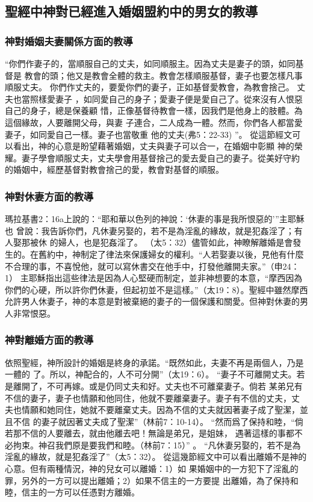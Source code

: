 \subsection{聖經中神對已經進入婚姻盟約中的男女的教導}
\subsubsection{神對婚姻夫妻關係方面的教導}
“你們作妻子的，當順服自己的丈夫，如同順服主。因為丈夫是妻子的頭，如同基督是
教會的頭；他又是教會全體的救主。教會怎樣順服基督，妻子也要怎樣凡事順服丈夫。
你們作丈夫的，要愛你們的妻子，正如基督愛教會，為教會捨己。 丈夫也當照樣愛妻子
，如同愛自己的身子；愛妻子便是愛自己了。從來沒有人恨惡自己的身子，總是保養顧
惜，正像基督待教會一樣，因我們是他身上的肢體。為這個緣故，人要離開父母，與妻
子連合，二人成為一體。然而，你們各人都當愛妻子，如同愛自己一樣。妻子也當敬重
他的丈夫(弗5：22-33) ”。
從這節經文可以看出，神的心意是盼望藉著婚姻，丈夫與妻子可以合一，在婚姻中彰顯
神的榮耀。妻子學會順服丈夫，丈夫學會用基督捨己的愛去愛自己的妻子。從美好守約
的婚姻中，經歷基督對教會捨己的愛，教會對基督的順服。


\subsubsection{神對休妻方面的教導}
瑪拉基書2：16a上說的：“耶和華以色列的神說：‘休妻的事是我所恨惡的’”主耶穌也
曾說：我告訴你們，凡休妻另娶的，若不是為淫亂的緣故，就是犯姦淫了；有人娶那被休
的婦人，也是犯姦淫了。 （太5：32）儘管如此，神瞭解離婚是會發生的。在舊約中，神制定了律法來保護婦女的權利。“人若娶妻以後，見他有什麼不合理的事，不喜悅他，就可以寫休書交在他手中，打發他離開夫家。”（申24：1） 主耶穌指出這些律法是因為人心堅硬而制定，並非神想要的本意，“摩西因為你們的心硬，所以許你們休妻，但起初並不是這樣。”（太19：8）。聖經中雖然摩西允許男人休妻子，神的本意是對被棄絕的妻子的一個保護和關愛。但神對休妻的男人非常恨惡。

\subsubsection{神對離婚方面的教導}
依照聖經，神所設計的婚姻是終身的承諾。“既然如此，夫妻不再是兩個人，乃是一體的
了。所以，神配合的，人不可分開”（太19：6）。
“妻子不可離開丈夫。若是離開了，不可再嫁。或是仍同丈夫和好。丈夫也不可離棄妻子。倘若
某弟兄有不信的妻子，妻子也情願和他同住，他就不要離棄妻子。妻子有不信的丈夫，丈
夫也情願和她同住，她就不要離棄丈夫。因為不信的丈夫就因著妻子成了聖潔，並且不信
的妻子就因著丈夫成了聖潔”（林前7：10-14）。
“然而爲了保持和睦，“倘若那不信的人要離去，就由他離去吧！無論是弟兄，是姐妹，
遇著這樣的事都不必拘束。神召我們原是要我們和睦。（林前7：15）” 。
“凡休妻另娶的，若不是為淫亂的緣故，就是犯姦淫了”（太5：32）。
從這幾節經文中可以看出離婚不是神的心意。但有兩種情況，神的兒女可以離婚：1）如
果婚姻中的一方犯下了淫亂的罪，另外的一方可以提出離婚；2）如果不信主的一方要提
出離婚，為了保持和睦，信主的一方可以任憑對方離婚。

